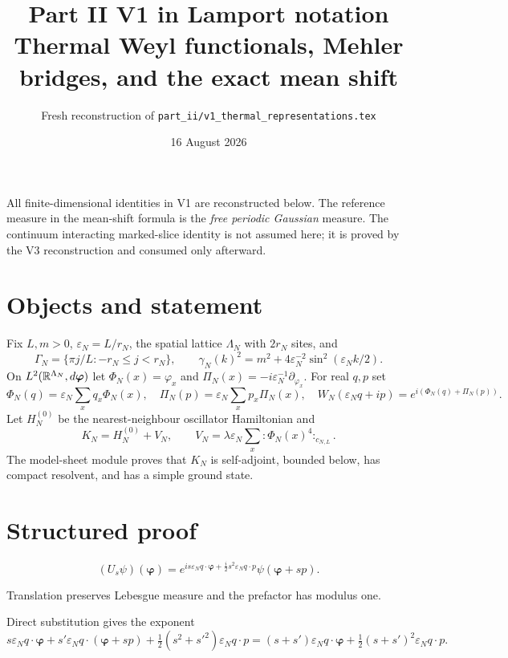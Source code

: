 \documentclass[11pt,a4paper]{article}
\title{Part II V1 in Lamport notation\\[3pt]
\large Thermal Weyl functionals, Mehler bridges, and the exact mean shift}
\author{Fresh reconstruction of \texttt{part\_ii/v1\_thermal\_representations.tex}}
\date{16 August 2026}
\newcommand{\eps}{\varepsilon}
\begin{document}
\maketitle

\begin{resultbox}
All finite-dimensional identities in V1 are reconstructed below.  The reference
measure in the mean-shift formula is the \emph{free periodic Gaussian} measure.  The
continuum interacting marked-slice identity is not assumed here; it is proved by the
V3 reconstruction and consumed only afterward.
\end{resultbox}
\tableofcontents

\section{Objects and statement}

Fix $L,m>0$, $\eps_N=L/r_N$, the spatial lattice $\Lambda_N$ with $2r_N$ sites,
and
\[
 \Gamma_N=\{\pi j/L:-r_N\le j<r_N\},\qquad
 \gamma_N(k)^2=m^2+4\eps_N^{-2}\sin^2(\eps_Nk/2).
\]
On $L^2(\mathbb R^{\Lambda_N},d\bm\varphi)$ let
$\Phi_N(x)=\varphi_x$ and $\Pi_N(x)=-i\eps_N^{-1}\partial_{\varphi_x}$.  For real
$q,p$ set
\[
 \Phi_N(q)=\eps_N\sum_xq_x\Phi_N(x),\quad
 \Pi_N(p)=\eps_N\sum_xp_x\Pi_N(x),\quad
 W_N(\eps_Nq+ip)=e^{i(\Phi_N(q)+\Pi_N(p))}.
\]
Let $H_N^{(0)}$ be the nearest-neighbour oscillator Hamiltonian and
\[
 K_N=H_N^{(0)}+V_N,\qquad
 V_N=\lambda\eps_N\sum_x{:}\Phi_N(x)^4{:}_{c_{N,L}}.
\]
The model-sheet module proves that $K_N$ is self-adjoint, bounded below, has compact
resolvent, and has a simple ground state.

\section{Structured proof}


\[
 (U_s\psi)(\bm\varphi)=
 e^{is\eps_Nq\cdot\bm\varphi+\frac i2s^2\eps_Nq\cdot p}
 \psi(\bm\varphi+sp).
\]


\Because Translation preserves Lebesgue measure and the prefactor has modulus one.


\Because Direct substitution gives the exponent
\[
 s\eps_Nq\cdot\bm\varphi+s'\eps_Nq\cdot(\bm\varphi+sp)
 +\tfrac12(s^2+s'^2)\eps_Nq\cdot p
 =(s+s')\eps_Nq\cdot\bm\varphi+\tfrac12(s+s')^2\eps_Nq\cdot p.
\]
\end{document}

